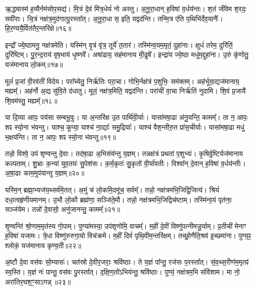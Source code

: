 ऋ॒द्ध्यास्म॑ ह॒व्यैर्नम॑सोप॒सद्य॑। 
मि॒त्रं दे॒वं मि॑त्र॒धेयं॑ नो अस्तु। 
अ॒नू॒रा॒धान् ह॒विषा॑ व॒र्धय॑न्तः। 
श॒तं जी॑वेम श॒रदः॒ सवी॑राः। 
चि॒त्रं नक्ष॑त्र॒मुद॑गात्पु॒रस्ता᳚त्। 
अ॒नू॒रा॒धा स॒ इति॒ यद्वद॑न्ति। 
तन्मि॒त्र ए॑ति प॒थिभि॑र्देव॒यानैः᳚। 
हि॒र॒ण्ययै॒र्वित॑तै\-र॒न्तरि॑क्षे॥१६॥ 

इन्द्रो᳚ ज्ये॒ष्ठामनु॒ नक्ष॑त्रमेति। 
यस्मि॑न् वृ॒त्रं वृ॑त्र॒ तूर्ये॑ त॒तार॑। 
तस्मि॑न्व॒यम॒मृतं॒ दुहा॑नाः। 
क्षुधं॑ तरेम॒ दुरि॑तिं॒ दुरि॑ष्टिम्। 
पु॒र॒न्द॒राय॑ वृष॒भाय॑ धृ॒ष्णवे᳚। 
अषा॑ढाय॒ सह॑मानाय मी॒ढुषे᳚। 
इन्द्रा॑य ज्ये॒ष्ठा मधु॑म॒द्दुहा॑ना। 
उ॒रुं कृ॑णोतु॒ यज॑मानाय लो॒कम्॥१७॥ 

मूलं॑ प्र॒जां वी॒रव॑तीं विदेय। 
परा᳚च्येतु॒ निर्ऋ॑तिः परा॒चा। 
गोभि॒र्नक्ष॑त्रं प॒शुभिः॒ सम॑क्तम्। 
अह॑र्भूया॒द्यज॑मानाय॒ मह्यम्᳚। 
अह॑र्नो अ॒द्य सु॑वि॒ते द॑धातु। 
मूलं॒ नक्ष॑त्र॒मिति॒ यद्वद॑न्ति। 
परा॑चीं वा॒चा निर्ऋ॑तिं नुदामि। 
शि॒वं प्र॒जायै॑ शि॒वम॑स्तु॒ मह्यम्᳚॥१८॥ 

या दि॒व्या आपः॒ पय॑सा सम्बभू॒वुः। 
या अ॒न्तरि॑क्ष उ॒त पार्थि॑वी॒र्याः। 
यासा॑मषा॒ढा अ॑नु॒यन्ति॒ कामम्᳚। 
ता न॒ आपः॒ शꣴ स्यो॒ना भ॑वन्तु। 
याश्च॒ कूप्या॒ याश्च॑ ना॒द्याः᳚ समु॒द्रियाः᳚। 
याश्च॑ वैश॒न्तीरु॒त प्रा॑स॒चीर्याः। 
यासा॑मषा॒ढा मधु॑ भ॒क्षय॑न्ति। 
ता न॒ आपः॒ शꣴ स्यो॒ना भ॑वन्तु॥१९॥ 

तन्नो॒ विश्वे॒ उप॑ शृण्वन्तु दे॒वाः। 
तद॑षा॒ढा अ॒भिसंय॑न्तु य॒ज्ञम्। 
तन्नक्ष॑त्रं प्रथतां प॒शुभ्यः॑। 
कृ॒षिर्वृ॒ष्टिर्यज॑मानाय कल्पताम्। 
शु॒भ्राः क॒न्या॑ युव॒तयः॑ सु॒पेश॑सः। 
क॒र्म॒कृतः॑ सु॒कृतो॑ वी॒र्या॑वतीः। 
विश्वा᳚न् दे॒वान् ह॒विषा॑ व॒र्धय॑न्तीः। 
अ॒षा॒ढाः काम॒मुप॑यान्तु य॒ज्ञम्॥२०॥ 

यस्मि॒न् ब्रह्मा॒भ्यज॑य॒थ्सर्व॑मे॒तत्। 
अ॒मुं च॑ लो॒कमि॒दमू॑च॒ सर्वम्᳚। 
तन्नो॒ नक्ष॑त्रमभि॒जिद्वि॒जित्य॑। 
श्रियं॑ दधा॒त्वहृ॑णीय\-मानम्। 
उ॒भौ लो॒कौ ब्रह्म॑णा॒ सञ्जि॑ते॒मौ। 
तन्नो॒ नक्ष॑त्रमभि॒जिद्विच॑ष्टाम्। 
तस्मि॑न्व॒यं पृत॑नाः॒ सञ्ज॑येम। 
तन्नो॑ दे॒वासो॒ अनु॑जानन्तु॒ कामम्᳚॥२१॥ 

शृ॒ण्वन्ति॑ श्रो॒णाम॒मृत॑स्य गो॒पाम्। 
पुण्या॑मस्या॒ उप॑शृणोमि॒ वाचम्᳚। 
म॒हीं दे॒वीं विष्णु॑पत्नीमजू॒र्याम्। 
प्र॒तीची॑ मेनाꣳ ह॒विषा॑ यजामः। 
त्रे॒धा विष्णु॑रुरुगा॒यो विच॑क्रमे। 
म॒हीं दिवं॑ पृथि॒वीम॒न्तरि॑क्षम्। 
तच्छ्रो॒णैति॒श्रव॑ इ॒च्छमा॑ना। 
पुण्य॒ꣴ॒ श्लोकं॒ यज॑मानाय कृण्व॒ती॥२२॥ 

अ॒ष्टौ दे॒वा वस॑वः सो॒म्यासः॑। 
चत॑स्रो दे॒वीर॒जराः॒ श्रवि॑ष्ठाः। 
ते य॒ज्ञं पा᳚न्तु॒ रज॑सः प॒रस्ता᳚त्। 
सं॒व॒थ्स॒रीण॑म॒मृतꣴ॑ स्व॒स्ति। 
य॒ज्ञं नः॑ पान्तु॒ वस॑वः पु॒रस्ता᳚त्। 
द॒क्षि॒ण॒तो॑ऽभिय॑न्तु॒ श्रवि॑ष्ठाः। 
पुण्यं॒ नक्ष॑त्रम॒भि संवि॑शाम। 
मा नो॒ अरा॑तिर॒घश॒ꣳ॒साऽगन्न्॥२३॥ 

